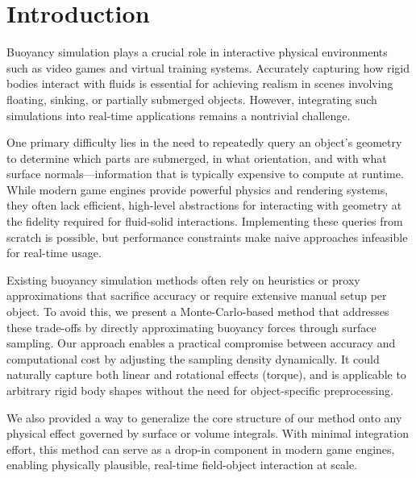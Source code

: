 \section{Introduction}

Buoyancy simulation plays a crucial role in interactive physical environments such as video games and virtual training systems.
Accurately capturing how rigid bodies interact with fluids is essential for achieving realism in scenes involving floating, sinking, or partially submerged objects.
However, integrating such simulations into real-time applications remains a nontrivial challenge.

One primary difficulty lies in the need to repeatedly query an object’s geometry to determine which parts are submerged, in what orientation, and with what surface normals---information that is typically expensive to compute at runtime.
While modern game engines provide powerful physics and rendering systems, they often lack efficient, high-level abstractions for interacting with geometry at the fidelity required for fluid-solid interactions.
Implementing these queries from scratch is possible, but performance constraints make naive approaches infeasible for real-time usage.

Existing buoyancy simulation methods often rely on heuristics or proxy approximations that sacrifice accuracy or require extensive manual setup per object.
To avoid this, we present a Monte-Carlo-based method that addresses these trade-offs by directly approximating buoyancy forces through surface sampling.
Our approach enables a practical compromise between accuracy and computational cost by adjusting the sampling density dynamically.
It could naturally capture both linear and rotational effects (torque), and is applicable to arbitrary rigid body shapes without the need for object-specific preprocessing.

We also provided a way to generalize the core structure of our method onto any physical effect governed by surface or volume integrals.
With minimal integration effort, this method can serve as a drop-in component in modern game engines, enabling physically plausible, real-time field-object interaction at scale.